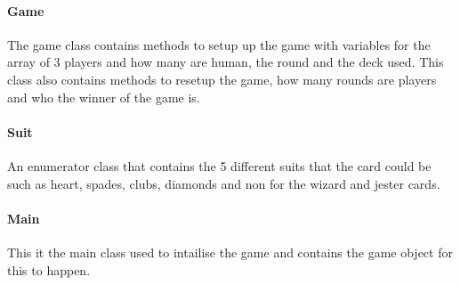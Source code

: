 \paragraph{Game}
The game class contains methods to setup up the game with variables for the array of 3 players and how many are human, the round  and the deck used. This class also contains methods to resetup the game, how many rounds are players and who the winner of the game is.
\paragraph{Suit}
An enumerator class that contains the 5 different suits that the card could be such as heart, spades, clubs, diamonds and non for the wizard and jester cards.
\paragraph{Main}
This it the main class used to intailise the game and contains the game object for this to happen.
